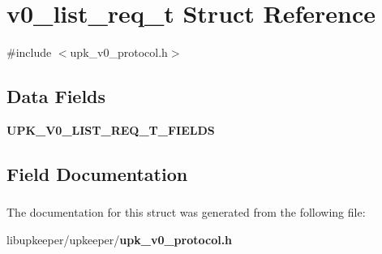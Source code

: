 \section{v0\_\-list\_\-req\_\-t Struct Reference}
\label{structv0__list__req__t}


{\ttfamily \#include $<$upk\_\-v0\_\-protocol.h$>$}

\subsection*{Data Fields}
\begin{DoxyCompactItemize}
\item 
{\bf UPK\_\-V0\_\-LIST\_\-REQ\_\-T\_\-FIELDS}
\end{DoxyCompactItemize}


\subsection{Field Documentation}
\subsubsection[{UPK\_\-V0\_\-LIST\_\-REQ\_\-T\_\-FIELDS}]{}\label{structv0__list__req__t_a3a1aad6316b189ad9a1d9120166705c7}


The documentation for this struct was generated from the following file:\begin{DoxyCompactItemize}
\item 
libupkeeper/upkeeper/{\bf upk\_\-v0\_\-protocol.h}\end{DoxyCompactItemize}
